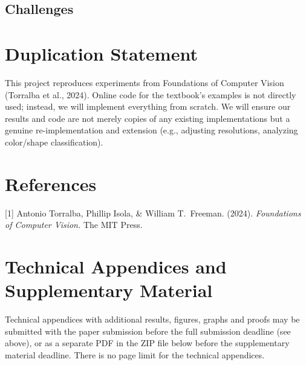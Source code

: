 \documentclass{article}
\begin{document}
\subsection{Challenges}
\section{Duplication Statement}
This project reproduces experiments from Foundations of Computer Vision (Torralba et al., 2024). Online code for the textbook’s examples is not directly used; instead, we will implement everything from scratch. We will ensure our results and code are not merely copies of any existing implementations but a genuine re-implementation and extension (e.g., adjusting resolutions, analyzing color/shape classification). 
\newpage
\section*{References}
\medskip
{
\small
[1] Antonio Torralba, Phillip Isola, \& William T.\ Freeman. (2024). \textit{Foundations of Computer Vision.} The MIT Press. 
}
\appendix
\section{Technical Appendices and Supplementary Material}
Technical appendices with additional results, figures, graphs and proofs may be submitted with the paper submission before the full submission deadline (see above), or as a separate PDF in the ZIP file below before the supplementary material deadline. There is no page limit for the technical appendices.
\end{document}
